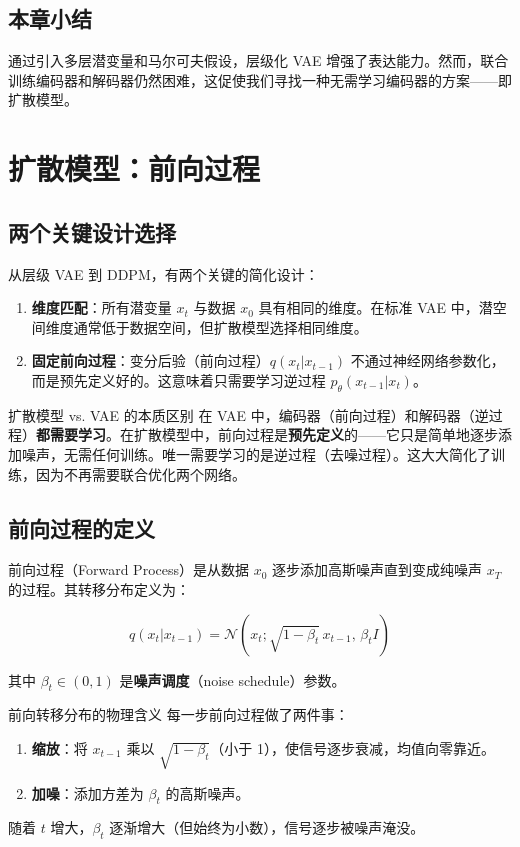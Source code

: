 \documentclass[a4paper]{article}
\begin{document}
\subsection{本章小结}

通过引入多层潜变量和马尔可夫假设，层级化 VAE 增强了表达能力。然而，联合训练编码器和解码器仍然困难，这促使我们寻找一种无需学习编码器的方案——即扩散模型。


\section{扩散模型：前向过程}

\subsection{两个关键设计选择}

从层级 VAE 到 DDPM，有两个关键的简化设计：

\begin{enumerate}
    \item \textbf{维度匹配}：所有潜变量 $x_t$ 与数据 $x_0$ 具有相同的维度。在标准 VAE 中，潜空间维度通常低于数据空间，但扩散模型选择相同维度。
    \item \textbf{固定前向过程}：变分后验（前向过程）$q(x_t|x_{t-1})$ 不通过神经网络参数化，而是预先定义好的。这意味着只需要学习逆过程 $p_\theta(x_{t-1}|x_t)$。
\end{enumerate}

\begin{importantbox}{扩散模型 vs. VAE 的本质区别}
在 VAE 中，编码器（前向过程）和解码器（逆过程）\textbf{都需要学习}。在扩散模型中，前向过程是\textbf{预先定义}的——它只是简单地逐步添加噪声，无需任何训练。唯一需要学习的是逆过程（去噪过程）。这大大简化了训练，因为不再需要联合优化两个网络。
\end{importantbox}

\subsection{前向过程的定义}

前向过程（Forward Process）是从数据 $x_0$ 逐步添加高斯噪声直到变成纯噪声 $x_T$ 的过程。其转移分布定义为：

$$q(x_t | x_{t-1}) = \mathcal{N}(x_t; \sqrt{1 - \beta_t} \, x_{t-1}, \, \beta_t I)$$

其中 $\beta_t \in (0, 1)$ 是\textbf{噪声调度}（noise schedule）参数。

\begin{importantbox}{前向转移分布的物理含义}
每一步前向过程做了两件事：
\begin{enumerate}
    \item \textbf{缩放}：将 $x_{t-1}$ 乘以 $\sqrt{1-\beta_t}$（小于 1），使信号逐步衰减，均值向零靠近。
    \item \textbf{加噪}：添加方差为 $\beta_t$ 的高斯噪声。
\end{enumerate}
随着 $t$ 增大，$\beta_t$ 逐渐增大（但始终为小数），信号逐步被噪声淹没。
\end{importantbox}
\end{document}
